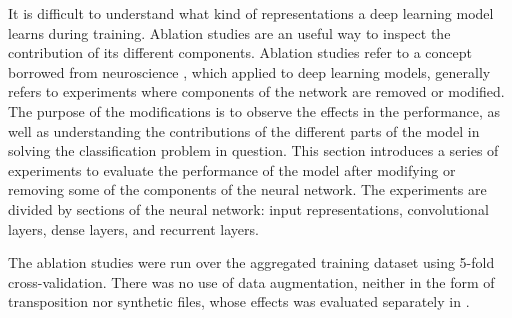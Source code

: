 
It is difficult to understand what kind of representations a
deep learning model learns during training. Ablation studies
are an useful way to inspect the contribution of its
different components. Ablation studies refer to a concept
borrowed from neuroscience \parencite{meyes2019ablation},
which applied to deep learning models, generally refers to
experiments where components of the network are removed or
modified. The purpose of the modifications is to observe the
effects in the performance, as well as understanding the
contributions of the different parts of the model in solving
the classification problem in question. This section
introduces a series of experiments to evaluate the
performance of the model after modifying or removing some of
the components of the neural network. The experiments are
divided by sections of the neural network: input
representations, convolutional layers, dense layers, and
recurrent layers.

The ablation studies were run over the aggregated training
dataset using 5-fold cross-validation. There was no use of
data augmentation, neither in the form of transposition nor
synthetic files, whose effects was evaluated separately in
.
